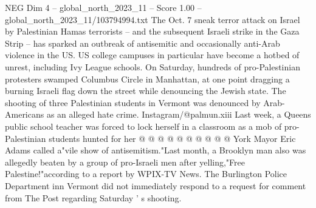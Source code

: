 \begin{textsample}{NEG Dim 4 – global\_north\_2023\_11 – Score 1.00 – global\_north\_2023\_11/103794994.txt}
The Oct. 7 sneak terror attack on Israel by Palestinian Hamas terrorists -- and the subsequent Israeli strike in the Gaza Strip -- has sparked an outbreak of antisemitic and occasionally anti-Arab violence in the US.
US college campuses in particular have become a hotbed of unrest, including Ivy League schools.
On Saturday, hundreds of pro-Palestinian protesters swamped Columbus Circle in Manhattan, at one point dragging a burning Israeli flag down the street while denouncing the Jewish state.
The shooting of three Palestinian students in Vermont was denounced by Arab-Americans as an alleged hate crime.
Instagram/@palmun.xiii Last week, a Queens public school teacher was forced to lock herself in a classroom as a mob of pro-Palestinian students hunted for her @ @ @ @ @ @ @ @ @ @ York Mayor Eric Adams called a"vile show of antisemitism."Last month, a Brooklyn man also was allegedly beaten by a group of pro-Israeli men after yelling,"Free Palestine!"according to a report by WPIX-TV News.
The Burlington Police Department inn Vermont did not immediately respond to a request for comment from The Post regarding Saturday ' s shooting.

\end{textsample}
